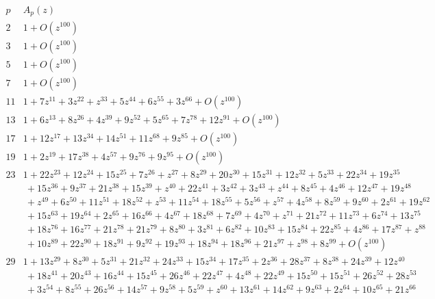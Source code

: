 \documentclass[11pt,leqno]{article}
\theoremstyle{remark}
\theoremstyle{definition}
\begin{document}
\begin{table}
\begin{equation*}
\begin{array}{|c|l|}
\hline
 p & A_p(z) \\[2pt]
 \hline
2 & 1 + O(z^{100}) \\[4pt]
3 & 1 + O(z^{100}) \\[4pt]
5 & 1 + O(z^{100}) \\[4pt]
7 & 1 + O(z^{100}) \\[4pt]
11 & 1 + 7 z^{11} + 3 z^{22} +  z^{33} + 5 z^{44} + 6 z^{55} + 3 z^{66} + O(z^{100}) \\[4pt]
13 & 1 + 6 z^{13} + 8 z^{26} + 4 z^{39} + 9 z^{52} + 5 z^{65} + 7 z^{78} + 12 z^{91} + O(z^{100}) \\[4pt]
17 & 1 + 12 z^{17} + 13 z^{34} + 14 z^{51} + 11 z^{68} + 9 z^{85} + O(z^{100}) \\[4pt]
19 & 1 + 2 z^{19} + 17 z^{38} + 4 z^{57} + 9 z^{76} + 9 z^{95} + O(z^{100}) \\[4pt]
23 & 1 + 22 z^{23} + 12 z^{24} + 15 z^{25} + 7 z^{26} +  z^{27} + 8 z^{29} + 20 z^{30} + 15 z^{31} + 12 z^{32} + 5 z^{33} + 22 z^{34} + 19 z^{35}\\
& ~+ 15 z^{36} + 9 z^{37} + 21 z^{38} + 15 z^{39} +  z^{40} + 22 z^{41} + 3 z^{42} + 3 z^{43} +  z^{44} + 8 z^{45} + 4 z^{46} + 12 z^{47} + 19 z^{48}\\
& ~+  z^{49} + 6 z^{50} + 11 z^{51} + 18 z^{52} +  z^{53} + 11 z^{54} + 18 z^{55} + 5 z^{56} +  z^{57} + 4 z^{58} + 8 z^{59} + 9 z^{60} + 2 z^{61} + 19 z^{62}\\
&~+ 15 z^{63} + 19 z^{64} + 2 z^{65} + 16 z^{66} + 4 z^{67} + 18 z^{68} + 7 z^{69} + 4 z^{70} +  z^{71} + 21 z^{72} + 11 z^{73} + 6 z^{74} + 13 z^{75}\\
& ~+ 18 z^{76} + 16 z^{77} + 21 z^{78} + 21 z^{79} + 8 z^{80} + 3 z^{81} + 6 z^{82} + 10 z^{83} + 15 z^{84} + 22 z^{85} + 4 z^{86} + 17 z^{87} +  z^{88}\\
& ~+ 10 z^{89} + 22 z^{90} + 18 z^{91} + 9 z^{92} + 19 z^{93} + 18 z^{94} + 18 z^{96} + 21 z^{97} +  z^{98} + 8 z^{99} + O(z^{100}) \\[4pt]
29 & 1 + 13 z^{29} + 8 z^{30} + 5 z^{31} + 21 z^{32} + 24 z^{33} + 15 z^{34} + 17 z^{35} + 2 z^{36} + 28 z^{37} + 8 z^{38} + 24 z^{39} + 12 z^{40}\\
&~+ 18 z^{41} + 20 z^{43} + 16 z^{44} + 15 z^{45} + 26 z^{46} + 22 z^{47} + 4 z^{48} + 22 z^{49} + 15 z^{50} + 15 z^{51} + 26 z^{52} + 28 z^{53}\\
&~+ 3 z^{54} + 8 z^{55} + 26 z^{56} + 14 z^{57} + 9 z^{58} + 5 z^{59} +  z^{60} + 13 z^{61} + 14 z^{62} + 9 z^{63} + 2 z^{64} + 10 z^{65} + 21 z^{66}\\

\end{array}
\end{equation*}
\end{table}
\end{document}
